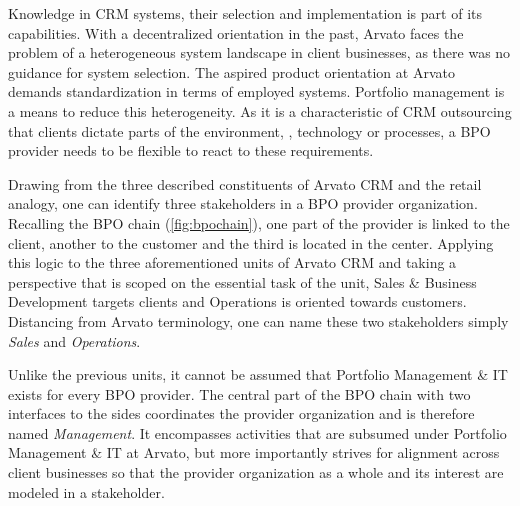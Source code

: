  Knowledge in CRM systems, their selection and implementation is part of its capabilities. With a decentralized orientation in the past, Arvato faces the problem of a heterogeneous system landscape in client businesses, as there was no guidance for system selection. The aspired product orientation at Arvato demands standardization in terms of employed systems. Portfolio management is a means to reduce this heterogeneity. As it is a characteristic of CRM outsourcing that clients dictate parts of the environment, \eg, technology or processes, a BPO provider needs to be flexible to react to these requirements. 
 
  Drawing from the three described constituents of Arvato CRM and the retail analogy, one can identify three stakeholders in a BPO provider organization. Recalling the BPO chain (\Fig \ref{fig:bpochain}), one part of the provider is linked to the client, another to the customer and the third is located in the center. Applying this logic to the three aforementioned units of Arvato CRM and taking a perspective that is scoped on the essential task of the unit, Sales \& Business Development targets clients and Operations is oriented towards customers. Distancing from Arvato terminology, one can name these two stakeholders simply \textit{Sales} and \textit{Operations}. 
  
  Unlike the previous units, it cannot be assumed that Portfolio Management \& IT exists for every \acrshort{BPO} provider. The central part of the \acrshort{BPO} chain with two interfaces to the sides coordinates the provider organization and is therefore named \textit{Management}. It encompasses activities that are subsumed under Portfolio Management \& IT at Arvato, but more importantly strives for alignment across client businesses so that the provider organization as a whole and its interest are modeled in a stakeholder. 
  

